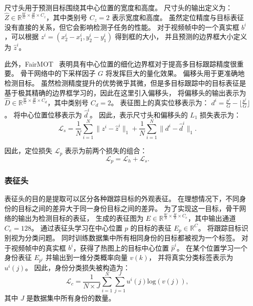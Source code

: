尺寸头用于预测目标围绕其中心位置的宽度和高度。
尺寸头的输出定义为： $\hat{Z} \in \mathbb{R}^{\frac{W}{G} \times \frac{H}{G} \times C_z} $，其中类别号 $C_z=2$ 表示宽度和高度。
虽然定位精度与目标表征没有直接的关系，但它会影响检测子任务的性能。
对于视频帧中的一个真实框 $b^i$，可以根据 $z^i = (x_2^i-x_1^i, y_2^i-y_1^i)$ 得到框的大小，
并且预测的边界框大小定义为 ${\hat{z}}^i$。

此外，FairMOT~\cite{fairmot} 表明具有中心位置的细化边界框对于提高多目标跟踪精度很重要。
骨干网络中的下采样因子 $G$ 将发挥巨大的量化效果。
偏移头用于更准确地检测目标。
虽然检测精度提升的优势微乎其微，但是多目标跟踪中的目标表征是基于极其精确的边界框学习的，因此在这里引入偏移头，
将偏移头的输出表示为 $\hat{D} \in \mathbb{R}^{\frac{W}{G} \times \frac{H}{G} \times C_d} $，其中类别号 $C_d=2$。
表征图上的真实位移表示为： $d^i = \frac{p^i}{G} - \lfloor \frac{p^i}{G} \rfloor $。
将中心位置位移表示为 ${\hat{d}}^i$。
因此，表示尺寸头和偏移头的 $L_1$ 损失表示为：
\begin{equation}
\mathcal{L}_{s} = \frac{1}{N} \sum_{i=1}^{N} \|z^i - \hat{z}^i\|_1 + 
\frac{1}{N} \sum_{i=1}^{N} \|d^i - \hat{d}^i\|_1.
\end{equation}

因此，定位损失 $\mathcal{L}_{p}$ 表示为前两个损失的组合：
\begin{equation}
\mathcal{L}_{p} = \mathcal{L}_{h} + \mathcal{L}_{s}.
\end{equation}


\subsubsection{表征头}
表征头的目的是提取可以区分各种跟踪目标的外观表征。
在理想情况下，不同身份的目标之间的差异大于同一身份目标之间的差异。
为了实现这一目标，骨干网络的输出为检测目标的表征，
生成的表征图为 $E \in \mathbb{R}^{\frac{W}{S} \times \frac{H}{S} \times C_e}$，其中输出通道 $C_e=128$。
通过表征头学习在中心位置 $p$ 的目标的表征 $E_{p}\in\mathbb{R}^{C}$。
将跟踪目标识别视为分类问题。
同时训练数据集中所有相同身份的目标都被视为一个标签。
对于视频帧中的真实框 $b^i$，获得了热图上的目标中心位置 $\hat{p}^i$。
在某个位置学习一个身份表征 $E_{p^i}$ 并输出到一维分类概率向量 $v(k)$，
并将真实分类标签表示为 $u^i{(j)}$。
因此，身份分类损失被构造为：
\begin{equation}
\mathcal{L}_{c} = \frac{1}{N \times J} \sum_{i=1}^{N} \sum_{j=1}^{J} u^i{(j)} \text{log}(v(j)),
\end{equation}
其中 $J$ 是数据集中所有身份的数量。

